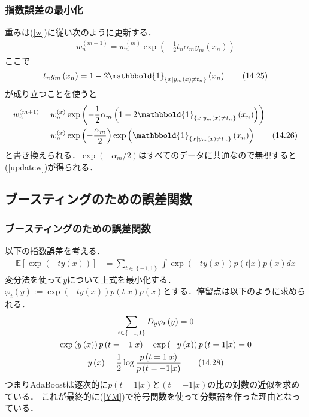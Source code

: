 \documentclass[10pt,hyperref={unicode}]{beamer}
\newcommand{\pref}[1]{{\fontfamily{lmr}\selectfont (\ref{#1})}}
\newcommand{\parentheses}[1]{\left(#1\right)}
\newcommand{\braces}[1]{\left\{#1\right\}}
\newcommand{\brackets}[1]{\left[#1\right]}
\begin{document}
\begin{frame}
\frametitle{指数誤差の最小化}
重みは\pref{w}に従い次のように更新する．
\begin{align}
    w_n^{\parentheses{m + 1}}
    = w_n^{\parentheses{m}} \exp\parentheses{-\frac{1}{2}t_n\alpha_m y_m \parentheses{x_n}}
    \tag{14.24}
\end{align}
ここで
\begin{align}
    t_n y_m\parentheses{x_n}
    = 1 - 2 \mathbbold{1}_{\braces{x | y_m\parentheses{x} \neq t_n}}\parentheses{x_n}
    \tag{14.25}
\end{align}
が成り立つことを使うと
\begin{align}
    w_n^{\parentheses{m + 1}}
    &= w_n^{\parentheses{x}} \exp\parentheses{-\frac{1}{2}\alpha_m
        \parentheses{1 - 2 \mathbbold{1}_{\braces{x | y_m\parentheses{x} \neq t_n}}\parentheses{x_n}}
    } \notag \\
    &= w_n^{\parentheses{x}} \exp\parentheses{-\frac{\alpha_m}{2}}
        \exp\parentheses{%
        \mathbbold{1}_{\braces{x | y_m\parentheses{x} \neq t_n}}\parentheses{x_n}
    } \tag{14.26}
\end{align}
と書き換えられる．$\exp\parentheses{-\alpha_m/2}$はすべてのデータに共通なので無視すると\pref{updatew}が得られる．
\end{frame}

\subsection{ブースティングのための誤差関数}
\begin{frame}
\frametitle{ブースティングのための誤差関数}
以下の指数誤差を考える．
\begin{align}
    \mathbb{E}\brackets{\exp\parentheses{-ty\parentheses{x}}}
    &= \sum_{t \in \braces{-1, 1}} \int \exp \parentheses{-ty\parentheses{x}}
    p\parentheses{t|x}p\parentheses{x}dx
    \tag{14.27}
\end{align}
変分法を使って$y$について上式を最小化する．
$\varphi_t\parentheses{y} := \exp\parentheses{-ty\parentheses{x}}p\parentheses{t|x}p\parentheses{x}$とする．停留点は以下のように求められる．
\begin{gather}
    \sum_{t \in \braces{-1, 1}} D_y\varphi_t\parentheses{y} = 0 \notag \\
    \exp\parentheses{y\parentheses{x}}p\parentheses{t = - 1 | x}
    - \exp\parentheses{-y\parentheses{x}}p\parentheses{t = 1 | x} = 0 \notag \\
    y\parentheses{x} = \frac{1}{2}\log \frac{p\parentheses{t = 1 | x}}{p\parentheses{t = -1 | x}}
    \tag{14.28}
\end{gather}
つまりAdaBoostは逐次的に$p\parentheses{t = 1|x}$と$\parentheses{t = -1|x}$の比の対数の近似を求めている．
これが最終的に\pref{YM}で符号関数を使って分類器を作った理由となっている．
\end{frame}
\end{document}
